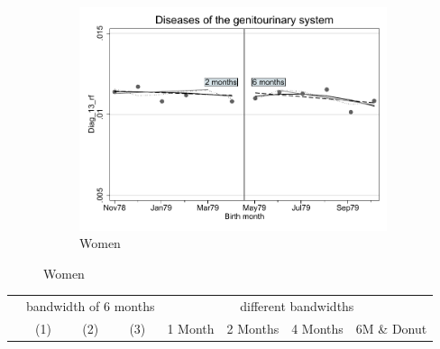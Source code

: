 \documentclass[a4paper ]{article}
\begin{document}
\begin{figure}[h]
\begin{subfigure}[t]{0.31\textwidth}
		\centering
		\includegraphics[width=0.99\textwidth]{R1_RD_Diag_13_rf_fits}
		\caption{Women}
	\end{subfigure}
\end{figure}


\begin{table}[h]\centering
\def\sym#1{\ifmmode^{#1}\else\(^{#1}\)\fi}
\begin{tabular}{l*{3}{c}|cccc}
\toprule
&\multicolumn{3}{c}{bandwidth of 6 months} & \multicolumn{4}{c}{different bandwidths} \\
 \cmidrule(lr{1em}){2-4} \cmidrule(lr{1em}){5-8}
 &\multicolumn{1}{c}{(1)}&\multicolumn{1}{c}{(2)}&\multicolumn{1}{c}{(3)}& 1 Month & 2 Months & 4 Months & 6M \& Donut \\
\midrule 

\bottomrule
\end{tabular}
\end{table}
\end{document}
